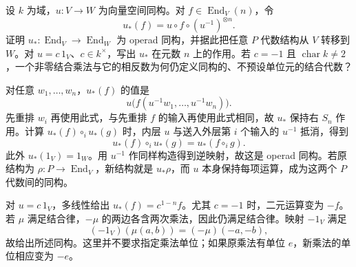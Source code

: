 \begin{exercise}\label{b4:ex:transport-operad-algebra}
	设 \(k\) 为域，\(u:V\rightarrow W\) 为向量空间同构。对 \(f\in\operatorname{End}_V(n)\)，令
	\[
		u_*(f)=u\circ f\circ(u^{-1})^{\otimes n}.
	\]
	证明 \(u_*:\operatorname{End}_V\rightarrow\operatorname{End}_W\) 为 operad 同构，并据此把任意 \(P\) 代数结构从 \(V\) 转移到 \(W\)。对 \(u=c\,1_V\)、\(c\in k^\times\)，写出 \(u_*\) 在元数 \(n\) 上的作用。若 \(c=-1\) 且 \(\operatorname{char}k\ne2\)，一个非零结合乘法与它的相反数为何仍定义同构的、不预设单位元的结合代数？
\end{exercise}
\begin{solution}
	对任意 \(w_1,\ldots,w_n\)，\(u_*(f)\) 的值是
	\[
		u\bigl(f(u^{-1}w_1,\ldots,u^{-1}w_n)\bigr).
	\]
	先重排 \(w_i\) 再使用此式，与先重排 \(f\) 的输入再使用此式相同，故 \(u_*\) 保持右 \(S_n\) 作用。计算 \(u_*(f)\circ_i u_*(g)\) 时，内层 \(u\) 与送入外层第 \(i\) 个输入的 \(u^{-1}\) 抵消，得到
	\[
		u_*(f)\circ_i u_*(g)=u_*(f\circ_i g).
	\]
	此外 \(u_*(1_V)=1_W\)。用 \(u^{-1}\) 作同样构造得到逆映射，故这是 operad 同构。若原结构为 \(\rho:P\rightarrow\operatorname{End}_V\)，新结构就是 \(u_*\rho\)，而 \(u\) 本身保持每项运算，成为这两个 \(P\) 代数间的同构。

	对 \(u=c\,1_V\)，多线性给出 \(u_*(f)=c^{1-n}f\)。尤其 \(c=-1\) 时，二元运算变为 \(-f\)。若 \(\mu\) 满足结合律，\(-\mu\) 的两边各含两次乘法，因此仍满足结合律。映射 \(-1_V\) 满足
	\[
		(-1_V)(\mu(a,b))=(-\mu)(-a,-b),
	\]
	故给出所述同构。这里并不要求指定乘法单位；如果原乘法有单位 \(e\)，新乘法的单位相应变为 \(-e\)。
\end{solution}

